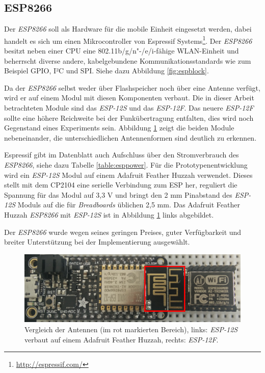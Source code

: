 \subsection{ESP8266}
Der \emph{ESP8266} soll als Hardware für die mobile Einheit eingesetzt werden, dabei handelt es sich um einen Mikrocontroller von Espressif Systems\footnote{\url{http://espressif.com/}}.
Der \emph{ESP8266} besitzt neben einer CPU eine 802.11b/g/n"-/e/i-fähige WLAN-Einheit und beherrscht diverse andere, kabelgebundene Kommunikationsstandards wie zum Beispiel GPIO, I²C und SPI. 
Siehe dazu Abbildung \ref{fig:espblock}. 

Da der \emph{ESP8266} selbst weder über Flashspeicher noch über eine Antenne verfügt, wird er auf einem Modul mit diesen Komponenten verbaut. 
Die in dieser Arbeit betrachteten Module sind das \emph{ESP-12S} und das \emph{ESP-12F}.
Das neuere \emph{ESP-12F} sollte eine höhere Reichweite bei der Funkübertragung entfalten, dies wird noch Gegenstand eines Experiments sein.
Abbildung \ref{fig:espmodules} zeigt die beiden Module nebeneinander, die unterschiedlichen Antennenformen sind deutlich zu erkennen.

Espressif gibt im Datenblatt auch Aufschluss über den Stromverbrauch des \emph{ESP8266}, siehe dazu Tabelle \ref{table:esppower}.
Für die Prototypenentwicklung wird ein \emph{ESP-12S} Modul auf einem Adafruit Feather Huzzah verwendet. 
Dieses stellt mit dem CP2104 eine serielle Verbindung zum ESP her, reguliert die Spannung für das Modul auf 3,3 V und bringt den 2 mm Pinabstand des \emph{ESP-12S} Moduls auf die für \emph{Breadboards} üblichen 2,5 mm.
Das Adafruit Feather Huzzah \emph{ESP8266} mit \emph{ESP-12S} ist in Abbildung \ref{fig:espmodules} links abgebildet.

Der \emph{ESP8266} wurde wegen seines geringen Preises, guter Verfügbarkeit und breiter Unterstützung bei der Implementierung ausgewählt.

\begin{figure}[h]
  \centering
	\includegraphics[width=\textwidth]{images/espmodules.png}
  \caption{Vergleich der Antennen (im rot markierten Bereich), links: \emph{ESP-12S} verbaut auf einem Adafruit Feather Huzzah, rechts: \emph{ESP-12F}.}
  \label{fig:espmodules}
\end{figure}

